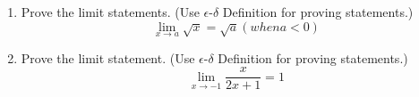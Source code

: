 \documentclass{oblivoir}
\begin{document}
\begin{enumerate}
		\item Prove the limit statements. (Use $\epsilon$-$\delta$ Definition for proving statements.)\\
 		\begin{equation}
 			\lim_{x \to a}{\sqrt{x}} = \sqrt{a} \nonumber (when a < 0)
 		\end{equation}
		
		\item Prove the limit statement. (Use $\epsilon$-$\delta$ Definition for proving statements.)\\
 		\begin{equation}
 			\lim_{x \to -1}{\frac{x}{2x+1}} = 1 \nonumber
 		\end{equation}
		
	\end{enumerate}
\end{document}
